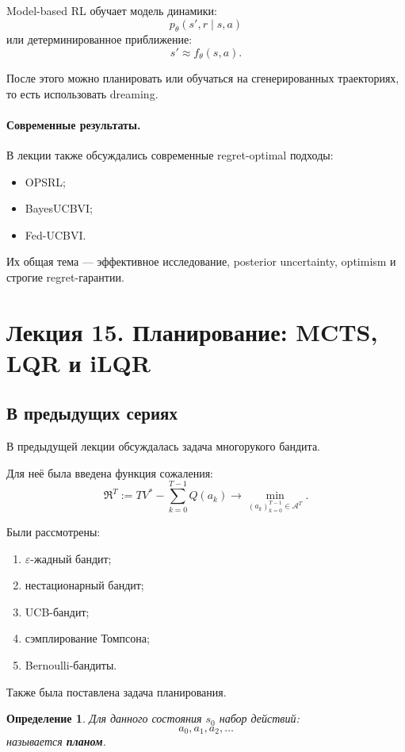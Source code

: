 \documentclass[12pt,a4paper]{article}
\newtheorem{definition}{Определение}
\begin{document}
Model-based RL обучает модель динамики:
\[
p_\theta(s',r\mid s,a)
\]
или детерминированное приближение:
\[
s'\approx f_\theta(s,a).
\]

После этого можно планировать или обучаться на сгенерированных траекториях, то есть использовать dreaming.

\paragraph{Современные результаты.}

В лекции также обсуждались современные regret-optimal подходы:

\begin{itemize}
    \item OPSRL;
    \item BayesUCBVI;
    \item Fed-UCBVI.
\end{itemize}

Их общая тема --- эффективное исследование, posterior uncertainty, optimism и строгие regret-гарантии.



\section{Лекция 15. Планирование: MCTS, LQR и iLQR}

\subsection{В предыдущих сериях}

В предыдущей лекции обсуждалась задача многорукого бандита.

Для неё была введена функция сожаления:
\[
\mathfrak R^T
:=
T V^\ast
-
\sum_{k=0}^{T-1}
Q(a_k)
\to
\min_{(a_k)_{k=0}^{T-1}\in \mathcal A^T}.
\]

Были рассмотрены:
\begin{enumerate}
    \item $\varepsilon$-жадный бандит;
    \item нестационарный бандит;
    \item UCB-бандит;
    \item сэмплирование Томпсона;
    \item Bernoulli-бандиты.
\end{enumerate}

Также была поставлена задача планирования.

\begin{definition}
Для данного состояния $s_0$ набор действий:
\[
a_0,a_1,a_2,\ldots
\]
называется \textbf{планом}.
\end{definition}
\end{document}
